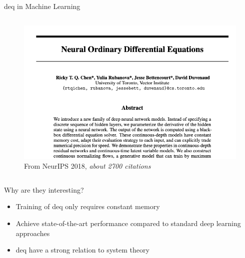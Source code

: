\documentclass[8pt, t,
aspectratio=169,%
]{beamer}
\begin{document}
\begin{frame}{\Acrlong{deq} in Machine Learning}
\begin{columns}[T]
            \begin{figure}
                \includegraphics[width=\textwidth]{node.png}
                \caption{From NeurIPS 2018, \emph{about 2700 citations} \cite{chen2018neural} }
            \end{figure}
    \end{columns}
    \pause
        
    \begin{block}{Why are they interesting?}
        \begin{itemize}
            \item Training of \gls{deq} only requires constant memory
            \item Achieve state-of-the-art performance compared to standard deep learning approaches
            \item \Gls{deq} have a strong relation to system theory
        \end{itemize}
    \end{block}
\end{frame}
\end{document}
